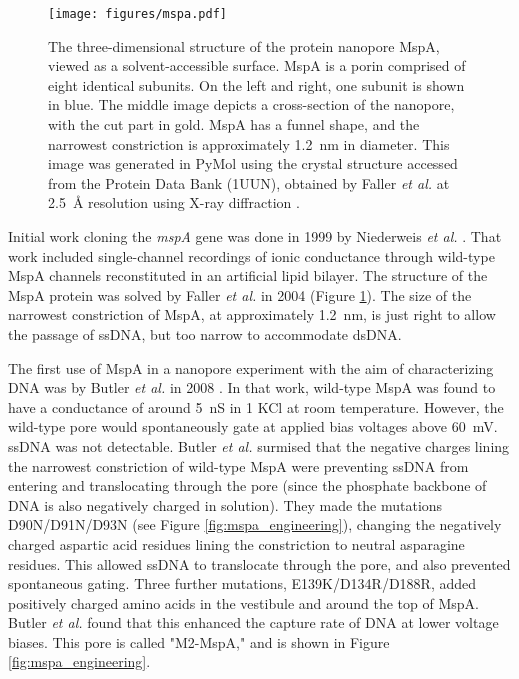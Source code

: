 \begin{figure}[h]
\begin{centering}
\texttt{[image: figures/mspa.pdf]}
\caption[The protein nanopore MspA]{The three-dimensional structure of the protein nanopore MspA, viewed as a solvent-accessible surface.  MspA is a porin comprised of eight identical subunits.  On the left and right, one subunit is shown in blue.  The middle image depicts a cross-section of the nanopore, with the cut part in gold.  MspA has a funnel shape, and the narrowest constriction is approximately \SI{1.2}{\nm} in diameter.  This image was generated in PyMol using the crystal structure accessed from the Protein Data Bank (1UUN), obtained by Faller \textit{et al.} at \SI{2.5}{\angstrom} resolution using X-ray diffraction \citep{Faller2004}.}
\label{fig:mspa}
\end{centering}
\end{figure}

Initial work cloning the \textit{mspA} gene was done in 1999 by Niederweis \textit{et al.} \citep{Niederweis1999}.  That work  included single-channel recordings of ionic conductance through wild-type MspA channels reconstituted in an artificial lipid bilayer.  The structure of the MspA protein was solved by Faller \textit{et al.} in 2004 \citep{Faller2004} (Figure \ref{fig:mspa}).  The size of the narrowest constriction of MspA, at approximately \SI{1.2}{\nm}, is just right to allow the passage of ssDNA, but too narrow to accommodate dsDNA.

The first use of MspA in a nanopore experiment with the aim of characterizing DNA was by Butler \textit{et al.} in 2008 \citep{Butler2008}.  In that work, wild-type MspA was found to have a conductance of around \SI{5}{\nano\siemens} in \SI{1}{\Molar} KCl at room temperature.  However, the wild-type pore would spontaneously gate at applied bias voltages above \SI{60}{\mV}.  ssDNA was not detectable.  Butler \textit{et al.} surmised that the negative charges lining the narrowest constriction of wild-type MspA were preventing ssDNA from entering and translocating through the pore (since the phosphate backbone of DNA is also negatively charged in solution).  They made the mutations D90N/D91N/D93N (see Figure \ref{fig:mspa_engineering}), changing the negatively charged aspartic acid residues lining the constriction to neutral asparagine residues.  This allowed ssDNA to translocate through the pore, and also prevented spontaneous gating.  Three further mutations, E139K/D134R/D188R, added positively charged amino acids in the vestibule and around the top of MspA.  Butler \textit{et al.} found that this enhanced the capture rate of DNA at lower voltage biases.  This pore is called "M2-MspA," and is shown in Figure \ref{fig:mspa_engineering}.

